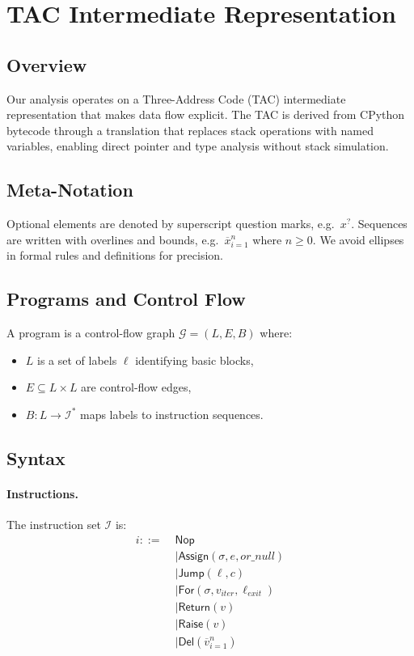 \section{TAC Intermediate Representation}
\label{sec:appendix-tac-ir}

\subsection{Overview}

Our analysis operates on a Three-Address Code (TAC) intermediate representation that makes data flow explicit.
The TAC is derived from CPython bytecode through a translation that replaces stack operations with named variables, enabling direct pointer and type analysis without stack simulation.

\subsection{Meta-Notation}

Optional elements are denoted by superscript question marks, e.g.\ $x^{?}$.
Sequences are written with overlines and bounds, e.g.\ $\overline{x}_{i=1}^{n}$ where $n \geq 0$.
We avoid ellipses in formal rules and definitions for precision.

\subsection{Programs and Control Flow}

A program is a control-flow graph $\mathcal{G} = (L,E,B)$ where:
\begin{itemize}
\item $L$ is a set of labels $\ell$ identifying basic blocks,
\item $E \subseteq L \times L$ are control-flow edges,
\item $B : L \to \mathcal{I}^*$ maps labels to instruction sequences.
\end{itemize}

\subsection{Syntax}

\paragraph{Instructions.}
The instruction set $\mathcal{I}$ is:
\[
\begin{aligned}
i ::= \;& \mathsf{Nop} \\
  &\mid \mathsf{Assign}(\sigma, e, \mathit{or\_null}) \\
  &\mid \mathsf{Jump}(\ell, c) \\
  &\mid \mathsf{For}(\sigma, v_{\mathit{iter}}, \ell_{\mathit{exit}}) \\
  &\mid \mathsf{Return}(v) \\
  &\mid \mathsf{Raise}(v) \\
  &\mid \mathsf{Del}(\overline{v}_{i=1}^{n})
\end{aligned}
\]

